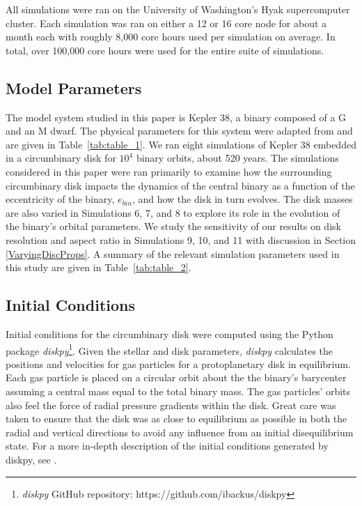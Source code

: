 All simulations were ran on the University of Washington's Hyak supercomputer cluster.  Each simulation was ran on either a 12 or 16 core node for about a month each with roughly 8,000 core hours used per simulation on average.  In total, over 100,000 core hours were used for the entire suite of simulations.

\subsection{Model Parameters}

The model system studied in this paper is Kepler 38, a binary composed of a G and an M dwarf.  The physical parameters for this 
system were adapted from \citet{Orosz12} and are given in Table~\ref{tab:table_1}.  We ran eight simulations of Kepler 38 embedded in a 
circumbinary disk for $10^4$ binary orbits, about 520 years.  The simulations considered in this paper were ran primarily to examine how 
the surrounding circumbinary disk impacts the dynamics of the central
binary as a function of the eccentricity of the binary, $e_{bin}$, and
how the disk in turn evolves.  The disk masses are also varied in Simulations 6, 7, and 8 to explore its role in the evolution of the binary's orbital parameters.  
We study the sensitivity of our results on disk resolution and aspect ratio in Simulations 9, 10, and 11 with discussion in Section 
\ref{VaryingDiscProps}.  A summary of the relevant simulation parameters used in this study are given in Table~\ref{tab:table_2}. 

\subsection{Initial Conditions}

Initial conditions for the circumbinary disk were computed using the
Python package {\em diskpy}\footnote{{\em diskpy} GitHub repository: https://github.com/ibackus/diskpy}.  
Given the stellar and disk parameters, {\em diskpy}
calculates the positions and velocities for gas particles for a
protoplanetary disk in equilibrium.   Each gas particle is placed on a
circular orbit about the the binary's barycenter assuming a central
mass equal to the total binary mass.  
The gas particles' orbits also feel the force of radial pressure gradients within the disk.  Great care was taken to ensure that the disk
was as close to equilibrium as possible in both the radial and vertical directions to avoid any influence from an initial disequilibrium
state.  For a more in-depth description of the initial conditions generated by diskpy, see \citet{Backus2016}.

